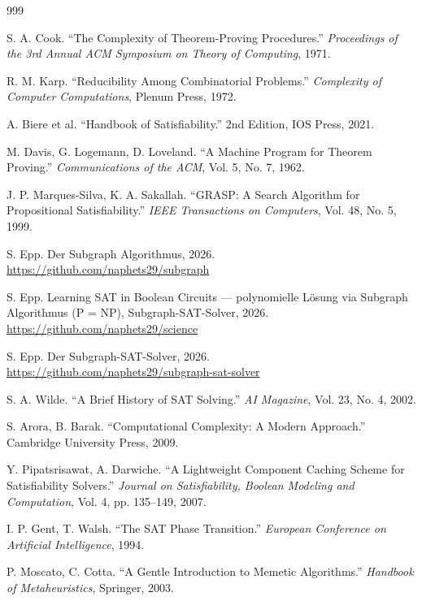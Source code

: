 ﻿\documentclass[a4paper,12pt]{article}
\theoremstyle{definition}
\begin{document}
\begin{thebibliography}{999}


 S. A. Cook. ``The Complexity of Theorem-Proving Procedures.'' \textit{Proceedings of the 3rd Annual ACM Symposium on Theory of Computing}, 1971.

 R. M. Karp. ``Reducibility Among Combinatorial Problems.'' \textit{Complexity of Computer Computations}, Plenum Press, 1972.

 A. Biere et al. ``Handbook of Satisfiability.'' 2nd Edition, IOS Press, 2021.

 M. Davis, G. Logemann, D. Loveland. ``A Machine Program for Theorem Proving.'' \textit{Communications of the ACM}, Vol. 5, No. 7, 1962.

 J. P. Marques-Silva, K. A. Sakallah. ``GRASP: A Search Algorithm for Propositional Satisfiability.'' \textit{IEEE Transactions on Computers}, Vol. 48, No. 5, 1999.

 S. Epp. Der Subgraph Algorithmus, 2026. \url{https://github.com/naphets29/subgraph}

 S. Epp. Learning SAT in Boolean Circuits — polynomielle Lösung via Subgraph Algorithmus (P = NP), Subgraph-SAT-Solver, 2026. \url{https://github.com/naphets29/science}

 S. Epp. Der Subgraph-SAT-Solver, 2026. \url{https://github.com/naphets29/subgraph-sat-solver}

 S. A. Wilde. ``A Brief History of SAT Solving.'' \textit{AI Magazine}, Vol. 23, No. 4, 2002.


 S. Arora, B. Barak. ``Computational Complexity: A Modern Approach.'' Cambridge University Press, 2009.

 Y. Pipatsrisawat, A. Darwiche. ``A Lightweight Component Caching Scheme for Satisfiability Solvers.'' \textit{Journal on Satisfiability, Boolean Modeling and Computation}, Vol. 4, pp. 135--149, 2007.

 I. P. Gent, T. Walsh. ``The SAT Phase Transition.'' \textit{European Conference on Artificial Intelligence}, 1994.

 P. Moscato, C. Cotta. ``A Gentle Introduction to Memetic Algorithms.'' \textit{Handbook of Metaheuristics}, Springer, 2003.


\end{thebibliography}
\end{document}
